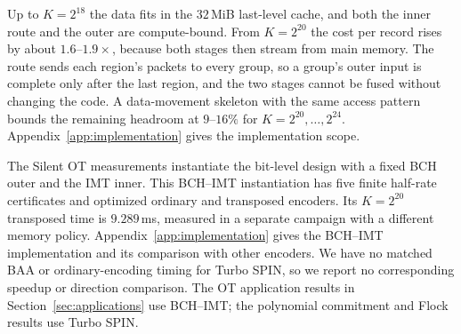 Up to $K=2^{18}$ the data fits in the $32$\,MiB last-level cache, and
both the inner route and the outer are compute-bound. From $K=2^{20}$
the cost per record rises by about $1.6$--$1.9\times$, because both
stages then stream from main memory. The route sends each region's
packets to every group, so a group's outer input is complete only after
the last region, and the two stages cannot be fused without changing the
code. A data-movement skeleton with the same access pattern bounds the
remaining headroom at $9$--$16\%$ for $K=2^{20},\ldots,2^{24}$.
Appendix~\ref{app:implementation} gives the implementation scope.

The Silent OT measurements instantiate the bit-level design with a fixed
BCH outer and the IMT inner. This BCH--IMT instantiation has
five finite half-rate certificates and optimized ordinary and transposed
encoders. Its $K=2^{20}$ transposed time is $9.289$\,ms, measured in a
separate campaign with a different memory policy. Appendix~\ref{app:implementation}
gives the BCH--IMT implementation and its comparison with other encoders.
We have no matched BAA or ordinary-encoding timing for Turbo SPIN, so we
report no corresponding speedup or direction comparison. The OT
application results in Section~\ref{sec:applications} use BCH--IMT; the
polynomial commitment and Flock results use Turbo SPIN.
